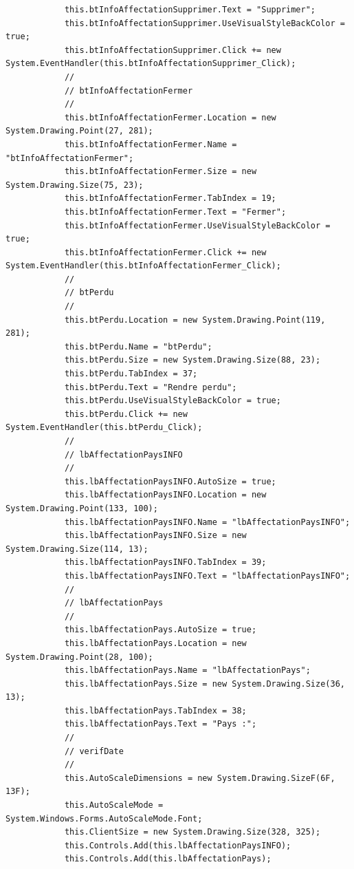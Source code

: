 \documentclass[main.tex]{subfiles}
\begin{document}
\begin{lstlisting}
            this.btInfoAffectationSupprimer.Text = "Supprimer";
            this.btInfoAffectationSupprimer.UseVisualStyleBackColor = true;
            this.btInfoAffectationSupprimer.Click += new System.EventHandler(this.btInfoAffectationSupprimer_Click);
            // 
            // btInfoAffectationFermer
            // 
            this.btInfoAffectationFermer.Location = new System.Drawing.Point(27, 281);
            this.btInfoAffectationFermer.Name = "btInfoAffectationFermer";
            this.btInfoAffectationFermer.Size = new System.Drawing.Size(75, 23);
            this.btInfoAffectationFermer.TabIndex = 19;
            this.btInfoAffectationFermer.Text = "Fermer";
            this.btInfoAffectationFermer.UseVisualStyleBackColor = true;
            this.btInfoAffectationFermer.Click += new System.EventHandler(this.btInfoAffectationFermer_Click);
            // 
            // btPerdu
            // 
            this.btPerdu.Location = new System.Drawing.Point(119, 281);
            this.btPerdu.Name = "btPerdu";
            this.btPerdu.Size = new System.Drawing.Size(88, 23);
            this.btPerdu.TabIndex = 37;
            this.btPerdu.Text = "Rendre perdu";
            this.btPerdu.UseVisualStyleBackColor = true;
            this.btPerdu.Click += new System.EventHandler(this.btPerdu_Click);
            // 
            // lbAffectationPaysINFO
            // 
            this.lbAffectationPaysINFO.AutoSize = true;
            this.lbAffectationPaysINFO.Location = new System.Drawing.Point(133, 100);
            this.lbAffectationPaysINFO.Name = "lbAffectationPaysINFO";
            this.lbAffectationPaysINFO.Size = new System.Drawing.Size(114, 13);
            this.lbAffectationPaysINFO.TabIndex = 39;
            this.lbAffectationPaysINFO.Text = "lbAffectationPaysINFO";
            // 
            // lbAffectationPays
            // 
            this.lbAffectationPays.AutoSize = true;
            this.lbAffectationPays.Location = new System.Drawing.Point(28, 100);
            this.lbAffectationPays.Name = "lbAffectationPays";
            this.lbAffectationPays.Size = new System.Drawing.Size(36, 13);
            this.lbAffectationPays.TabIndex = 38;
            this.lbAffectationPays.Text = "Pays :";
            // 
            // verifDate
            // 
            this.AutoScaleDimensions = new System.Drawing.SizeF(6F, 13F);
            this.AutoScaleMode = System.Windows.Forms.AutoScaleMode.Font;
            this.ClientSize = new System.Drawing.Size(328, 325);
            this.Controls.Add(this.lbAffectationPaysINFO);
            this.Controls.Add(this.lbAffectationPays);

\end{lstlisting}
\end{document}
